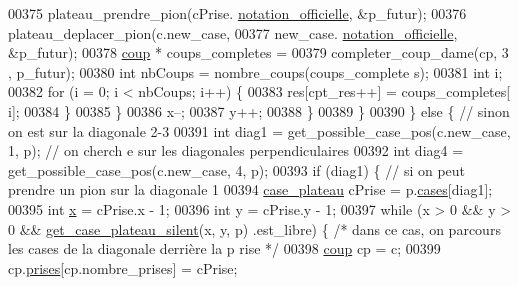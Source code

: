 \begin{DoxyCode}
00375                                         plateau\_prendre\_pion(cPrise.
      \hyperlink{structcase__plateau_ad510581b324604a9cf685cbb769a421a}{notation_officielle}, &p\_futur);
00376                                         plateau\_deplacer\_pion(c.new\_case,
00377                                                         new\_case.
      \hyperlink{structcase__plateau_ad510581b324604a9cf685cbb769a421a}{notation_officielle}, &p\_futur);
00378                                         \hyperlink{structcoup}{coup} * coups\_completes =
00379                                                         completer\_coup\_dame(cp, 3
      , p\_futur);
00380                                         \textcolor{keywordtype}{int} nbCoups = nombre\_coups(coups\_complete
      s);
00381                                         \textcolor{keywordtype}{int} i;
00382                                         \textcolor{keywordflow}{for} (i = 0; i < nbCoups; i++) \{
00383                                                 res[cpt\_res++] = coups\_completes[
      i];
00384                                         \}
00385                                 \}
00386                                 x--;
00387                                 y++;
00388                         \}
00389                 \}
00390         \} \textcolor{keywordflow}{else} \{ \textcolor{comment}{// sinon on est sur la diagonale 2-3}
00391                 \textcolor{keywordtype}{int} diag1 = get\_possible\_case\_pos(c.new\_case, 1, p); \textcolor{comment}{// on cherch
      e sur les diagonales perpendiculaires}
00392                 \textcolor{keywordtype}{int} diag4 = get\_possible\_case\_pos(c.new\_case, 4, p);
00393                 \textcolor{keywordflow}{if} (diag1) \{ \textcolor{comment}{// si on peut prendre un pion sur la diagonale 1}
00394                         \hyperlink{structcase__plateau}{case_plateau} cPrise = p.\hyperlink{structplateau_a6afaa60f594542e0d742b0c6d3223392}{cases}[diag1];
00395                         \textcolor{keywordtype}{int} \hyperlink{plateau_8h_a9e00f85b4b6ec2d8bdfbe94ff40f0eeeacab1e15e82c5976bfb476ddfe145263c}{x} = cPrise.x - 1;
00396                         \textcolor{keywordtype}{int} y = cPrise.y - 1;
00397                         \textcolor{keywordflow}{while} (x > 0 && y > 0 && \hyperlink{plateau_8h_a60a8f706865d0ae9087f8d65d4667655}{get_case_plateau_silent}(x, y, p)
      .est\_libre) \{ \textcolor{comment}{/* dans ce cas, on parcours les cases de la diagonale derrière la p
      rise */}
00398                                 \hyperlink{structcoup}{coup} cp = c;
00399                                 cp.\hyperlink{structcoup_ae19b3a66d3f4e66b8f69a38e4005f44a}{prises}[cp.nombre\_prises] = cPrise;

\end{DoxyCode}
